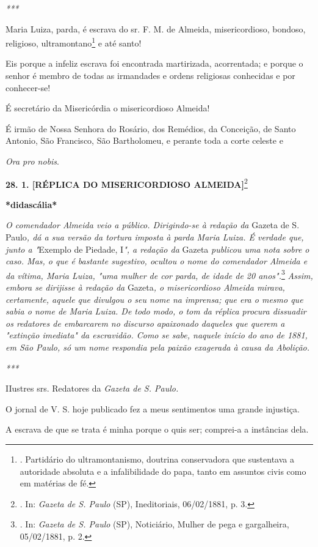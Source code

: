 \emph{***}

Maria Luiza, parda, é escrava do sr. F. M. de Almeida, misericordioso,
bondoso, religioso, ultramontano\footnote{. Partidário do
  ultramontanismo, doutrina conservadora que sustentava a autoridade
  absoluta e a infalibilidade do papa, tanto em assuntos civis como em
  matérias de fé.} e até
santo!

Eis porque a infeliz escrava foi encontrada martirizada, acorrentada; e
porque o senhor é membro de todas as irmandades e ordens religiosas
conhecidas e por conhecer-se!

É secretário da Misericórdia o misericordioso Almeida!

É irmão de Nossa Senhora do Rosário, dos Remédios, da Conceição, de
Santo Antonio, São Francisco, São Bartholomeu, e perante toda a corte
celeste e

\emph{Ora pro nobis}.

\textbf{28. 1. {[}RÉPLICA DO MISERICORDIOSO ALMEIDA{]}}\footnote{. In:
  \emph{Gazeta de S. Paulo} (SP), Ineditoriais, 06/02/1881, p. 3.}

\textbf{*didascália*}

\emph{O comendador Almeida veio a público. Dirigindo-se à redação da}
Gazeta de S. Paulo\emph{, dá a sua versão da tortura imposta à parda
Maria Luiza. É verdade que, junto a "}Exemplo de Piedade, I\emph{", a
redação da} Gazeta \emph{publicou uma nota sobre o caso. Mas, o que é
bastante sugestivo, ocultou o nome do comendador Almeida e da vítima,
Maria Luiza, "uma mulher de cor parda, de idade de 20 anos".}\footnote{.
  In: \emph{Gazeta de S. Paulo} (SP), Noticiário, Mulher de pega e
  gargalheira, 05/02/1881, p. 2.}
\emph{Assim, embora se
dirijisse à redação da} Gazeta\emph{, o misericordioso Almeida mirava,
certamente, aquele que divulgou o seu nome na imprensa; que era o mesmo
que sabia o nome de Maria Luiza. De todo modo, o tom da réplica procura
dissuadir os redatores de embarcarem no discurso apaixonado daqueles que
querem a "extinção imediata" da escravidão. Como se sabe, naquele início
do ano de 1881, em São Paulo, só um nome respondia pela paixão exagerada
à causa da Abolição. }

\emph{***}

IIustres srs. Redatores da \emph{Gazeta de S. Paulo.}

O jornal de V. S. hoje publicado fez a meus sentimentos uma grande
injustiça.

A escrava de que se trata é minha porque o quis ser; comprei-a a
instâncias dela.

